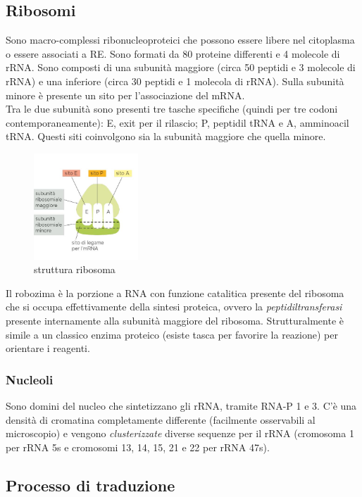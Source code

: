     \subsection{Ribosomi}
        Sono macro-complessi ribonucleoproteici che possono essere libere nel citoplasma o essere associati a RE. Sono formati da 80 proteine differenti e 4 molecole di rRNA. Sono composti di una subunità maggiore (circa 50 peptidi e 3 molecole di rRNA) e una inferiore (circa 30 peptidi e 1 molecola di rRNA). Sulla subunità minore è presente un sito per l'associazione del mRNA.\\
        Tra le due subunità sono presenti tre tasche specifiche (quindi per tre codoni contemporaneamente): E, exit per il rilascio; P, peptidil tRNA e A, amminoacil tRNA. Questi siti coinvolgono sia la subunità maggiore che quella minore. 
        \begin{figure}[h]
                \centering
                \includegraphics[width=0.35\textwidth]{images/ribosoma.JPG}
                \caption{\small struttura ribosoma}
                \label{fig:mesh1}
        \end{figure}
        Il robozima è la porzione a RNA con funzione catalitica presente del ribosoma che si occupa effettivamente della sintesi proteica, ovvero la \textit{peptidiltransferasi} presente internamente alla subunità maggiore del ribosoma. Strutturalmente è simile a un classico enzima proteico (esiste tasca per favorire la reazione) per orientare i reagenti.
        \subsubsection{Nucleoli}
            Sono domini del nucleo che sintetizzano gli rRNA, tramite RNA-P 1 e 3. C'è una densità di cromatina completamente differente (facilmente osservabili al microscopio) e vengono \textit{clusterizzate} diverse sequenze per il rRNA (cromosoma 1 per rRNA 5s e cromosomi 13, 14, 15, 21 e 22 per rRNA 47s).
    
    \subsection{Processo di traduzione}
